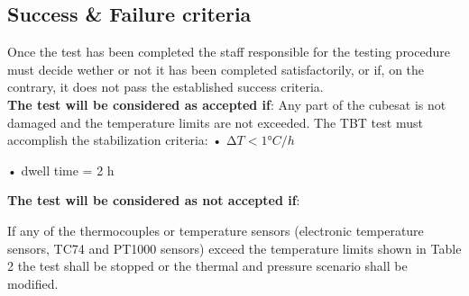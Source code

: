 \subsection{Success \& Failure criteria}
 Once the test has been completed the staff responsible for the testing procedure must decide wether or not it has been completed satisfactorily, or if, on the contrary, it does not pass the established success criteria.\\
\textbf{The test will be considered as accepted if}:
Any part of the cubesat is not damaged and the temperature limits are not exceeded. The TBT test must accomplish the stabilization criteria:
•	$\mathrm{\Delta} T < 1 °C/h$

•	dwell time = 2 h

\textbf{The test will be considered as not accepted if}:

If any of the thermocouples or temperature sensors (electronic temperature sensors, TC74 and PT1000 sensors) exceed the temperature limits shown in Table 2 the test shall be stopped or the thermal and pressure scenario shall be modified.

